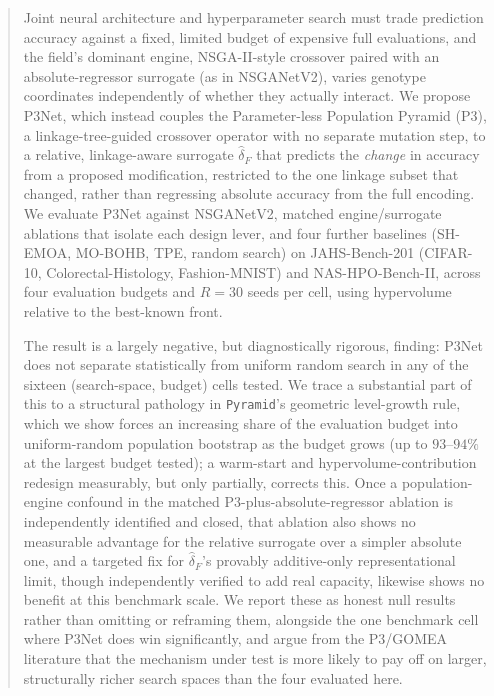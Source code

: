 \begin{abstract}
Joint neural architecture and hyperparameter search must trade prediction accuracy against a fixed, limited
budget of expensive full evaluations, and the field's dominant engine, NSGA-II-style crossover paired with an
absolute-regressor surrogate (as in NSGANetV2), varies genotype coordinates independently of whether they
actually interact. We propose P3Net, which instead couples the Parameter-less Population Pyramid (P3), a
linkage-tree-guided crossover operator with no separate mutation step, to a relative, linkage-aware surrogate
$\hat\delta_F$ that predicts the \emph{change} in accuracy from a proposed modification, restricted to the one
linkage subset that changed, rather than regressing absolute accuracy from the full encoding. We evaluate
P3Net against NSGANetV2, matched engine/surrogate ablations that isolate each design lever, and four further
baselines (SH-EMOA, MO-BOHB, TPE, random search) on JAHS-Bench-201 (CIFAR-10, Colorectal-Histology,
Fashion-MNIST) and NAS-HPO-Bench-II, across four evaluation budgets and $R=30$ seeds per cell, using
hypervolume relative to the best-known front.

The result is a largely negative, but diagnostically rigorous, finding: P3Net does not separate statistically
from uniform random search in any of the sixteen (search-space, budget) cells tested. We trace a substantial
part of this to a structural pathology in \texttt{Pyramid}'s geometric level-growth rule, which we show
forces an increasing share of the evaluation budget into uniform-random population bootstrap as the budget
grows (up to $93$--$94\%$ at the largest budget tested); a warm-start and hypervolume-contribution redesign
measurably, but only partially, corrects this. Once a population-engine confound in the matched
P3-plus-absolute-regressor ablation is independently identified and closed, that ablation also shows no
measurable advantage for the relative surrogate over a simpler absolute one, and a targeted fix for
$\hat\delta_F$'s provably additive-only representational limit, though independently verified to add real
capacity, likewise shows no benefit at this benchmark scale. We report these as honest null results rather
than omitting or reframing them, alongside the one benchmark cell where P3Net does win significantly, and
argue from the P3/GOMEA literature that the mechanism under test is more likely to pay off on larger,
structurally richer search spaces than the four evaluated here.
\end{abstract}

